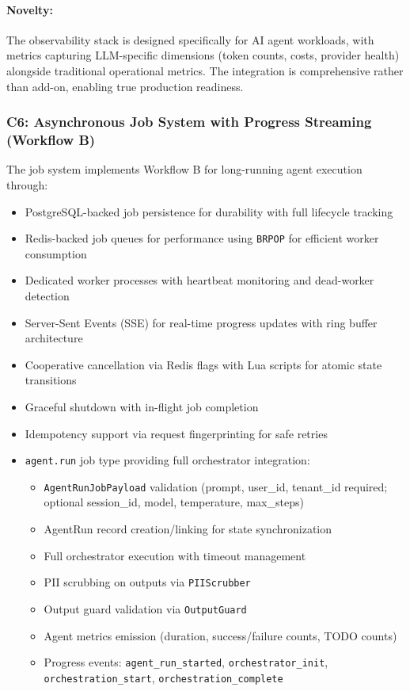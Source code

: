 \documentclass[a4paper,twoside]{sapthesis}
\begin{document}
\paragraph{Novelty:} The observability stack is designed specifically for AI agent workloads, with metrics capturing LLM-specific dimensions (token counts, costs, provider health) alongside traditional operational metrics. The integration is comprehensive rather than add-on, enabling true production readiness.

\subsubsection{C6: Asynchronous Job System with Progress Streaming (Workflow B)}

The job system implements Workflow B for long-running agent execution through:

\begin{itemize}
    \item PostgreSQL-backed job persistence for durability with full lifecycle tracking
    \item Redis-backed job queues for performance using \texttt{BRPOP} for efficient worker consumption
    \item Dedicated worker processes with heartbeat monitoring and dead-worker detection
    \item Server-Sent Events (SSE) for real-time progress updates with ring buffer architecture
    \item Cooperative cancellation via Redis flags with Lua scripts for atomic state transitions
    \item Graceful shutdown with in-flight job completion
    \item Idempotency support via request fingerprinting for safe retries
    \item \texttt{agent.run} job type providing full orchestrator integration:
    \begin{itemize}
        \item \texttt{AgentRunJobPayload} validation (prompt, user\_id, tenant\_id required; optional session\_id, model, temperature, max\_steps)
        \item AgentRun record creation/linking for state synchronization
        \item Full orchestrator execution with timeout management
        \item PII scrubbing on outputs via \texttt{PIIScrubber}
        \item Output guard validation via \texttt{OutputGuard}
        \item Agent metrics emission (duration, success/failure counts, TODO counts)
        \item Progress events: \texttt{agent\_run\_started}, \texttt{orchestrator\_init}, \texttt{orchestration\_start}, \texttt{orchestration\_complete}
    \end{itemize}
\end{itemize}
\end{document}
